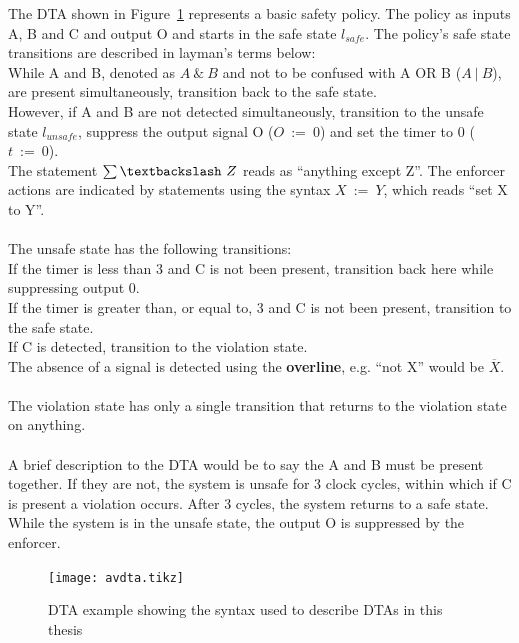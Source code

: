 \begin{example}\label{ex:dta}
	The \ac{DTA} shown in Figure~\ref{fig:avdta} represents a basic safety policy.
	The policy as inputs A, B and C and output O and starts in the safe state $l_{safe}$.
	The policy's safe state transitions are described in layman's terms below: \\
	While A and B, denoted as $A~\&~B$ and not to be confused with A OR B ($A~|~B$), are present simultaneously, transition back to the safe state.\\
	However, if A and B are not detected simultaneously, transition to the unsafe state $l_{unsafe}$, suppress the output signal O ($O~:=~0$) and set the timer to 0 ($t~:=~0$).\\
	The statement $\sum\textbackslash~Z$ reads as ``anything except Z''.
	The enforcer actions are indicated by statements using the syntax $X~:=~Y$, which reads ``set X to Y''.\\
	\\
	The unsafe state has the following transitions:\\
	If the timer is less than 3 and C is not been present, transition back here while suppressing output 0.\\
	If the timer is greater than, or equal to, 3 and C is not been present, transition to the safe state.\\
	If C is detected, transition to the violation state.\\
	The absence of a signal is detected using the \textbf{overline}, e.g. ``not X'' would be $\overline{X}$.\\
	\\
	The violation state has only a single transition that returns to the violation state on anything.\\
	\\
	A brief description to the \ac{DTA} would be to say the A and B must be present together. 
	If they are not, the system is unsafe for 3 clock cycles, within which if C is present a violation occurs.
	After 3 cycles, the system returns to a safe state.
	While the system is in the unsafe state, the output O is suppressed by the enforcer.
\end{example}

\begin{figure}[h]
	\centering
	\texttt{[image: avdta.tikz]}
	\caption{\ac{DTA} example showing the syntax used to describe \acp{DTA} in this thesis\label{fig:avdta}}
\end{figure}

